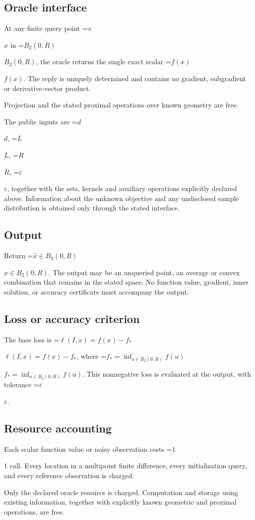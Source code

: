 \documentclass[10pt,a4paper]{article}
\newcommand{\AtlasMath}[1]{\par\begingroup\centering\setbox0=\hbox{$\displaystyle #1$}\ifdim\wd0>1.4\linewidth\typeout{ATLAS WIDE FORMULA: \the\wd0}\fi\ifdim\wd0>\linewidth\resizebox{\linewidth}{!}{\box0}\else\box0\fi\par\endgroup}
\newcommand{\AtlasInlineMath}[1]{\begingroup\setbox0=\hbox{$#1$}\ifdim\wd0>.4\linewidth\endgroup\AtlasMath{#1}\else\endgroup$#1$\fi}
\begin{document}
\subsection{Oracle interface}
At any finite query point \AtlasInlineMath{x} in \AtlasInlineMath{B_2(0,R)}, the oracle returns the single exact scalar \AtlasInlineMath{f(x)}. The reply is uniquely determined and contains no gradient, subgradient or derivative-vector product.

Projection and the stated proximal operations over known geometry are free.

The public inputs are \AtlasInlineMath{d}, \AtlasInlineMath{L}, \AtlasInlineMath{R}, \AtlasInlineMath{\varepsilon}, together with the sets, kernels and auxiliary operations explicitly declared above. Information about the unknown objective and any undisclosed sample distribution is obtained only through the stated interface.

\subsection{Output}
Return \AtlasInlineMath{\widehat{x}\in B_2(0,R)}. The output may be an unqueried point, an average or convex combination that remains in the stated space. No function value, gradient, inner solution, or accuracy certificate must accompany the output.

\subsection{Loss or accuracy criterion}
The base loss is \AtlasInlineMath{\ell(I,x)=f(x)-f_*}, where \AtlasInlineMath{f_*=\inf_{u\in B_2(0,R)}f(u)}. This nonnegative loss is evaluated at the output, with tolerance \AtlasInlineMath{\varepsilon}.

\subsection{Resource accounting}
Each scalar function value or noisy observation costs \AtlasInlineMath{1} call. Every location in a multipoint finite difference, every initialization query, and every reference observation is charged.

Only the declared oracle resource is charged. Computation and storage using existing information, together with explicitly known geometric and proximal operations, are free.
\end{document}
